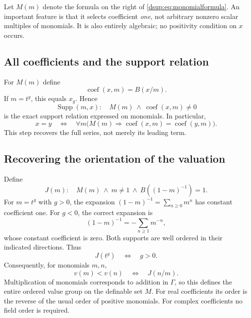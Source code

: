 \documentclass[11pt,oneside]{article}
\numberwithin{equation}{section}
\theoremstyle{definition}
\theoremstyle{remark}
\newcommand{\coef}{\operatorname{coef}}
\DeclareMathOperator{\Supp}{Supp}
\begin{document}
Let $M(m)$ denote the formula on the right of
\eqref{dsup:eq:monomialformula}. An important feature is that it selects
coefficient \emph{one}, not arbitrary nonzero scalar multiples of
monomials. It is also entirely algebraic; no positivity condition on
$x$ occurs.

\subsection{All coefficients and the support relation}

For $M(m)$ define
\begin{equation}\label{dsup:eq:coefficientformula}
 \coef(x,m)=B(x/m).
\end{equation}
If $m=t^g$, this equals $x_g$. Hence
\begin{equation}\label{dsup:eq:supportformula}
 \Supp(m,x):\quad M(m)\ \land\ \coef(x,m)\ne0
\end{equation}
is the exact support relation expressed on monomials. In particular,
\begin{equation}\label{dsup:eq:coefficientsseparate}
 x=y\quad\Longleftrightarrow\quad
 \forall m\bigl(M(m)\Rightarrow\coef(x,m)=\coef(y,m)\bigr).
\end{equation}
This step recovers the full series, not merely its leading term.

\subsection{Recovering the orientation of the valuation}

Define
\begin{equation}\label{dsup:eq:infmon}
 J(m):\quad M(m)\ \land\ m\ne1\ \land\ B((1-m)^{-1})=1.
\end{equation}
For $m=t^g$ with $g>0$, the expansion
$(1-m)^{-1}=\sum_{n\ge0}m^n$ has constant coefficient one.
For $g<0$, the correct expansion is
\[
 (1-m)^{-1}=-\sum_{n\ge1}m^{-n},
\]
whose constant coefficient is zero. Both supports are well ordered in
their indicated directions. Thus
\begin{equation}\label{dsup:eq:infmeaning}
 J(t^g)\quad\Longleftrightarrow\quad g>0.
\end{equation}
Consequently, for monomials $m,n$,
\begin{equation}\label{dsup:eq:monomialorder}
 v(m)<v(n)\quad\Longleftrightarrow\quad J(n/m).
\end{equation}
Multiplication of monomials corresponds to addition in $\Gamma$, so
this defines the entire ordered value group on the definable set $M$.
For real coefficients its order is the reverse of the usual order of
positive monomials. For complex coefficients no field order is required.
\end{document}
